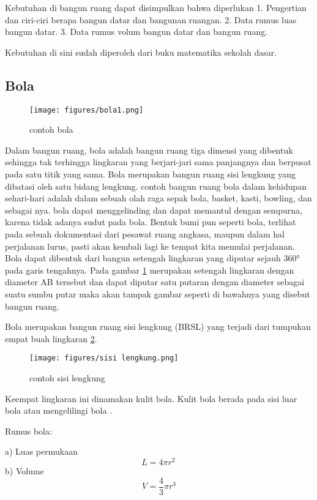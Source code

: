 Kebutuhan di bangun ruang dapat disimpulkan bahwa diperlukan 
1.    Pengertian dan ciri-ciri berapa bangun datar dan bangunan ruangan.
2.    Data rumus luas bangun datar.
3.    Data rumus volum bangun datar dan bangun ruang.

Kebutuhan di sini sudah diperoleh dari buku matematika sekolah dasar.

\subsection{Bola} 

\begin{figure}[ht]
    \centering
	\texttt{[image: figures/bola1.png]}
    \caption{contoh bola}
    \label{bola1}
\end{figure}

Dalam bangun ruang, bola adalah bangun ruang tiga dimensi yang dibentuk sehingga tak terhingga lingkaran yang berjari-jari sama panjangnya dan berpusat pada satu titik yang sama. Bola merupakan bangun ruang sisi lengkung yang dibatasi oleh satu bidang lengkung.
contoh bangun ruang bola dalam kehidupan sehari-hari adalah dalam sebuah olah raga sepak bola, basket, kasti, bowling, dan sebagai nya. bola dapat menggelinding dan dapat memantul dengan sempurna, karena tidak adanya sudut pada bola. 
Bentuk bumi pun seperti bola, terlihat pada sebuah dokumentasi dari pesawat ruang angkasa, maupun dalam hal perjalanan lurus, pasti akan kembali lagi ke tempat kita memulai perjalanan.
Bola dapat dibentuk dari bangun setengah lingkaran yang diputar sejauh 360° pada garis tengahnya. 
Pada gambar  \ref{bola1} merupakan setengah lingkaran dengan diameter AB  tersebut dan dapat diputar satu putaran dengan diameter sebagai suatu sumbu putar maka akan tampak gambar seperti di bawahnya yang disebut bangun ruang.


Bola merupakan bangun ruang sisi lengkung (BRSL) yang terjadi dari tumpukan empat buah lingkaran \ref{sisi lengkung}.
\begin{figure}[ht]
    \centering
\texttt{[image: figures/sisi lengkung.png]}
    \caption{contoh sisi lengkung}
    \label{sisi lengkung}
    \end{figure} 
Keempat lingkaran ini dinamakan kulit bola. Kulit bola berada pada sisi luar bola atau mengelilingi bola \cite{nurfarikhin2010hubungan}.

Rumus bola:

a) Luas permukaan
 \begin{equation}
     L = 4 \pi r^2 \,
\end{equation}
b) Volume
\begin{equation}
     V = \frac{4}{3}\pi r^3
\end{equation}

